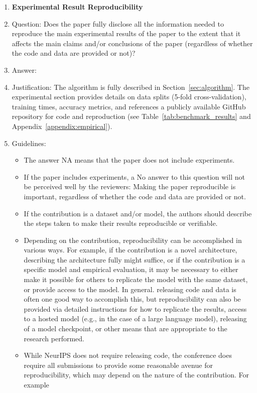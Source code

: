 \documentclass{article}
\begin{document}
\begin{enumerate}
    \item {\bf Experimental Result Reproducibility}
    \item[] Question: Does the paper fully disclose all the information needed to reproduce the main experimental results of the paper to the extent that it affects the main claims and/or conclusions of the paper (regardless of whether the code and data are provided or not)?
    \item[] Answer: \answerYes{}
    \item[] Justification: The algorithm is fully described in Section~\ref{sec:algorithm}. The experimental section provides details on data splits (5-fold cross-validation), training times, accuracy metrics, and references a publicly available GitHub repository for code and reproduction (see Table~\ref{tab:benchmark_results} and Appendix~\ref{appendix:empirical}).
    \item[] Guidelines:
    \begin{itemize}
        \item The answer NA means that the paper does not include experiments.
        \item If the paper includes experiments, a No answer to this question will not be perceived well by the reviewers: Making the paper reproducible is important, regardless of whether the code and data are provided or not.
        \item If the contribution is a dataset and/or model, the authors should describe the steps taken to make their results reproducible or verifiable. 
        \item Depending on the contribution, reproducibility can be accomplished in various ways. For example, if the contribution is a novel architecture, describing the architecture fully might suffice, or if the contribution is a specific model and empirical evaluation, it may be necessary to either make it possible for others to replicate the model with the same dataset, or provide access to the model. In general. releasing code and data is often one good way to accomplish this, but reproducibility can also be provided via detailed instructions for how to replicate the results, access to a hosted model (e.g., in the case of a large language model), releasing of a model checkpoint, or other means that are appropriate to the research performed.
        \item While NeurIPS does not require releasing code, the conference does require all submissions to provide some reasonable avenue for reproducibility, which may depend on the nature of the contribution. For example

\end{itemize}
\end{enumerate}
\end{document}
